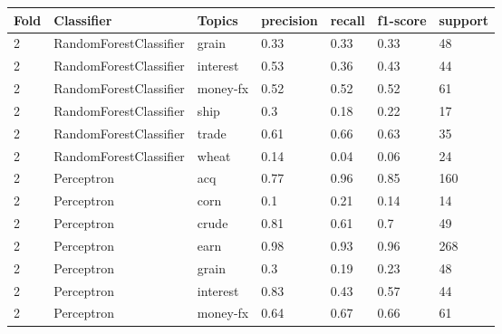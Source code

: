\documentclass{article}
\begin{document}
\begin{table}[h]
\begin{tabular}{lllllll}
\textbf{Fold} & \textbf{Classifier}    & \textbf{Topics} & \textbf{precision} & \textbf{recall} & \textbf{f1-score} & \textbf{support} \\ \hline
2             & RandomForestClassifier & grain           & 0.33               & 0.33            & 0.33              & 48               \\
2             & RandomForestClassifier & interest        & 0.53               & 0.36            & 0.43              & 44               \\
2             & RandomForestClassifier & money-fx        & 0.52               & 0.52            & 0.52              & 61               \\
2             & RandomForestClassifier & ship            & 0.3                & 0.18            & 0.22              & 17               \\
2             & RandomForestClassifier & trade           & 0.61               & 0.66            & 0.63              & 35               \\
2             & RandomForestClassifier & wheat           & 0.14               & 0.04            & 0.06              & 24               \\
2             & Perceptron             & acq             & 0.77               & 0.96            & 0.85              & 160              \\
2             & Perceptron             & corn            & 0.1                & 0.21            & 0.14              & 14               \\
2             & Perceptron             & crude           & 0.81               & 0.61            & 0.7               & 49               \\
2             & Perceptron             & earn            & 0.98               & 0.93            & 0.96              & 268              \\
2             & Perceptron             & grain           & 0.3                & 0.19            & 0.23              & 48               \\
2             & Perceptron             & interest        & 0.83               & 0.43            & 0.57              & 44               \\
2             & Perceptron             & money-fx        & 0.64               & 0.67            & 0.66              & 61               \\

\end{tabular}
\end{table}
\end{document}

